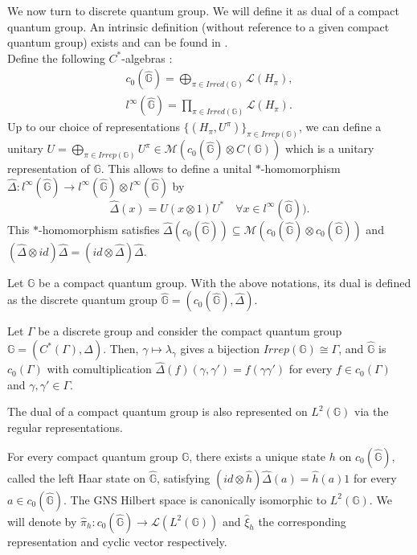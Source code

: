 We now turn to discrete quantum group. We will define it as dual of a compact quantum group. An intrinsic definition (without reference to a given compact quantum group) exists and can be found in \cite{vandaele}.\\

Define the following $C^*$-algebras :
\[\begin{array}{c}
c_0(\hat{\mathbb G})= \bigoplus_{\pi\in Irred(\mathbb G)} \mathcal L(H_\pi),\\
l^\infty(\hat{\mathbb G})= \prod_{\pi\in Irred(\mathbb G)} \mathcal L(H_\pi).
\end{array}\]
Up to our choice of representations $\{(H_\pi,U^\pi)\}_{\pi\in Irrep(\mathbb G)}$, we can define a unitary $U = \bigoplus_{\pi\in Irrep(\mathbb G)} U^\pi\in \mathcal M(c_0(\hat{\mathbb G}) \otimes C(\mathbb G))$ which is a unitary representation of $\mathbb G$. This allows to define a unital $*$-homomorphism $\hat \Delta : l^\infty(\hat{\mathbb G}) \rightarrow l^\infty(\hat{\mathbb G})\otimes l^\infty(\hat{\mathbb G})$ by 
\[\hat\Delta ( x) = U(x \otimes 1)U^*\quad \forall x\in l^\infty(\hat{\mathbb G})).\]
This $*$-homomorphism satisfies $\hat\Delta(c_0(\hat{\mathbb G}))\subseteq \mathcal M(c_0(\hat{\mathbb G})\otimes c_0(\hat{\mathbb G}))$ and $(\hat\Delta \otimes id) \hat\Delta = (id\otimes \hat\Delta)\hat\Delta$. %

\begin{definition}
Let $\mathbb G$ be a compact quantum group. With the above notations, its dual is defined as the discrete quantum group $\hat{\mathbb G} = (c_0(\hat{\mathbb G}),\hat\Delta)$.
\end{definition}

\begin{Expl} Let $\Gamma$ be a discrete group and consider the compact quantum group $\mathbb G=(C^*(\Gamma),\Delta)$. Then, $\gamma\mapsto \lambda_\gamma$ gives a bijection $Irrep(\mathbb G)\cong \Gamma$, and $\hat{\mathbb G}$ is $c_0(\Gamma)$ with comultiplication $\hat\Delta (f)(\gamma,\gamma') = f(\gamma\gamma')$ for every $f\in c_0(\Gamma)$ and $\gamma,\gamma'\in\Gamma$.
\end{Expl}

The dual of a compact quantum group is also represented on $L^2(\mathbb G)$ via the regular representations. 
\begin{prop}
For every compact quantum group $\mathbb G$, there exists a unique state $h$ on $c_0(\hat{\mathbb G})$, called the left Haar state on $\hat{\mathbb G}$, satisfying $(id\otimes \hat h)\hat\Delta(a) = \hat h(a)1 $ for every $a\in c_0(\hat{\mathbb G})$. The GNS Hilbert space is canonically isomorphic to $L^2(\mathbb G)$. We will denote by $\hat \pi_h : c_0(\hat{\mathbb G})\rightarrow \mathcal L(L^2(\mathbb G))$ and $\hat \xi_h$ the corresponding representation and cyclic vector respectively.  
\end{prop}

